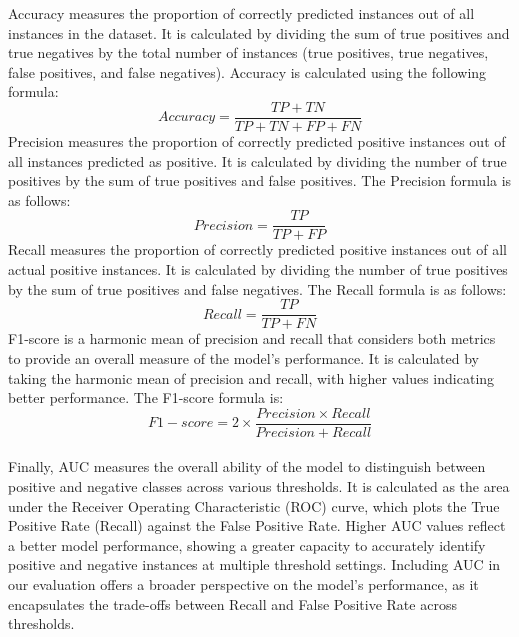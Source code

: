 \documentclass[10pt,journal]{IEEEtran}%
\begin{document}
Accuracy measures the proportion of correctly predicted instances out of all instances in the dataset.
It is calculated by dividing the sum of true positives and true negatives by the total number of instances (true positives, true negatives, false positives, and false negatives).
Accuracy is calculated using the following formula:
\begin{equation}
Accuracy = \frac{TP + TN}{TP + TN + FP + FN}
\end{equation}
Precision measures the proportion of correctly predicted positive instances out of all instances predicted as positive. 
It is calculated by dividing the number of true positives by the sum of true positives and false positives.
The Precision formula is as follows:
\begin{equation}
Precision = \frac{TP}{TP + FP}
\end{equation}
Recall measures the proportion of correctly predicted positive instances out of all actual positive instances. 
It is calculated by dividing the number of true positives by the sum of true positives and false negatives.
The Recall formula is as follows:
\begin{equation}
Recall = \frac{TP}{TP + FN}
\end{equation}
F1-score is a harmonic mean of precision and recall that considers both metrics to provide an overall measure of the model's performance. 
It is calculated by taking the harmonic mean of precision and recall, with higher values indicating better performance. 
The F1-score formula is:
\begin{equation}
F1-score = 2 \times \frac{Precision \times Recall}{Precision + Recall}
\end{equation}\\
Finally, AUC measures the overall ability of the model to distinguish between positive and negative classes across various thresholds. It is calculated as the area under the Receiver Operating Characteristic (ROC) curve, which plots the True Positive Rate (Recall) against the False Positive Rate. Higher AUC values reflect a better model performance, showing a greater capacity to accurately identify positive and negative instances at multiple threshold settings. Including AUC in our evaluation offers a broader perspective on the model’s performance, as it encapsulates the trade-offs between Recall and False Positive Rate across thresholds.
\end{document}
